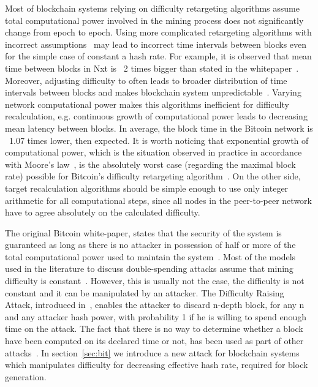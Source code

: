 \documentclass[number,preprint,review]{elsarticle}
\begin{document}
Most of blockchain systems relying on difficulty retargeting algorithms assume total computational power involved in the mining process does not significantly change from epoch to epoch.
Using more complicated retargeting algorithms with incorrect assumptions~\cite{andruiman2014} may lead to incorrect time intervals between blocks even for the simple case of constant a hash rate. For example, it is observed that mean time between blocks in Nxt is ~2 times bigger than stated in the whitepaper~\cite{nxt}. Moreover, adjusting difficulty to often leads to broader distribution of time intervals between blocks and makes blockchain system unpredictable~\cite{andruiman2014}.
Varying network computational power makes this algorithms inefficient for difficulty recalculation, e.g. continuous growth of computational power leads to decreasing mean latency between blocks. In average, the block time in the Bitcoin network is ~1.07 times lower, then expected.
It is worth noticing that exponential growth of computational power, which is the situation observed in practice in accordance with Moore’s law~\cite{moore2006cramming}, is the absolutely worst case (regarding the maximal block rate) possible for Bitcoin’s difficulty retargeting algorithm~\cite{kraft2015difficulty}.
On the other side, target recalculation algorithms should be simple enough to use only integer arithmetic for all computational steps, since all nodes in the peer-to-peer network have to agree absolutely on the calculated difficulty.

The original Bitcoin white-paper, states that the security of the system is guaranteed as long as there is no attacker in possession of half or more of the total computational power used to maintain the system~\cite{Nakamoto2008}.
Most of the models used in the literature to discuss double-spending attacks assume that mining difficulty is constant~\cite{??}.
However, this is usually not the case, the difficulty is not constant and it can be manipulated by an attacker.
The Difficulty Raising Attack, introduced in~\cite{bahack2013theoretical}, enables the attacker to discard n-depth block, for any n and any attacker hash power, with probability 1 if he is willing to spend enough time on the attack.
The fact that there is no way to determine whether a block have been computed on its declared time or not, has been used as part of other attacks~\cite{timejacking2011, artforz2011}.
In section~\ref{sec:bit} we introduce a new attack for blockchain systems which manipulates difficulty for decreasing effective hash rate, required for block generation.
\end{document}
